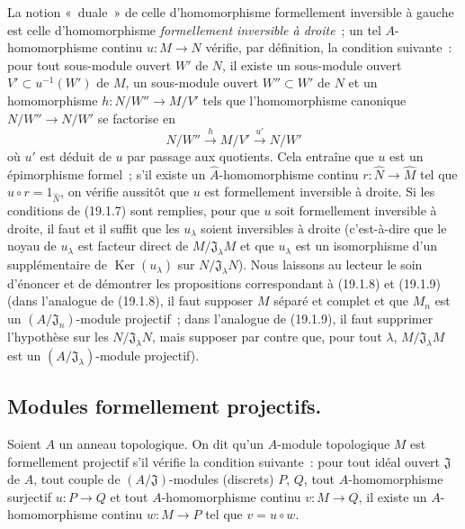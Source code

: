 
\begin{remark}[19.1.15]
\label{0.19.1.15-fr}
La notion «~duale~» de celle d'homomorphisme formellement inversible à gauche
est celle d'homomorphisme \emph{formellement inversible à droite}~; un tel
$A$-homomorphisme continu $u:M\to N$ vérifie, par définition, la condition
suivante~: pour tout sous-module ouvert $W'$ de $N$, il existe un sous-module
ouvert $V'\subset u^{-1}(W')$ de $M$, un sous-module ouvert $W''\subset W'$ de
$N$ et un homomorphisme $h:N/W''\to M/V'$ tels que l'homomorphisme canonique
$N/W''\to N/W'$ se factorise en
\[
  N/W''\xrightarrow{h}M/V'\xrightarrow{u'}N/W'
\]
où $u'$ est déduit de $u$ par passage aux quotients. Cela entraîne que $u$ est
un épimorphisme formel~; s'il existe un $\widehat A$-homomorphisme continu
$r:\widehat N\to\widehat M$ tel que $\widehat u\circ r=1_{\widehat N}$, on
vérifie aussitôt que $u$ est formellement inversible à droite. Si les
conditions de (19.1.7) sont remplies, pour que $u$ soit formellement inversible
à droite, il faut et il suffit que les $u_\lambda$ soient inversibles à droite
(c'est-à-dire que le noyau de $u_\lambda$ est facteur direct de
$M/\mathfrak J_\lambda M$ et que $u_\lambda$ est un isomorphisme d'un
supplémentaire de $\operatorname{Ker}(u_\lambda)$ sur
$N/\mathfrak J_\lambda N$). Nous laissons au lecteur le soin d'énoncer et de
démontrer les propositions correspondant à (19.1.8) et (19.1.9) (dans
l'analogue de (19.1.8), il faut supposer $M$ séparé et complet et que $M_n$ est
un $(A/\mathfrak J_n)$-module projectif~; dans l'analogue de (19.1.9), il faut
supprimer l'hypothèse sur les $N/\mathfrak J_\lambda N$, mais supposer par
contre que, pour tout $\lambda$, $M/\mathfrak J_\lambda M$ est un
$(A/\mathfrak J_\lambda)$-module projectif).
\end{remark}

\subsection{Modules formellement projectifs.}
\label{subsection:0.19.2-fr}

\begin{definition}[19.2.1]
\label{0.19.2.1-fr}
Soient $A$ un anneau topologique. On dit qu'un $A$-module topologique $M$ est
formellement projectif s'il vérifie la condition suivante~: pour tout
idéal ouvert $\mathfrak J$ de $A$, tout couple de $(A/\mathfrak J)$-modules
(discrets) $P$, $Q$, tout $A$-homomorphisme surjectif $u:P\to Q$ et tout
$A$-homomorphisme continu $v:M\to Q$, il existe un $A$-homomorphisme continu
$w:M\to P$ tel que $v=u\circ w$.
\end{definition}

